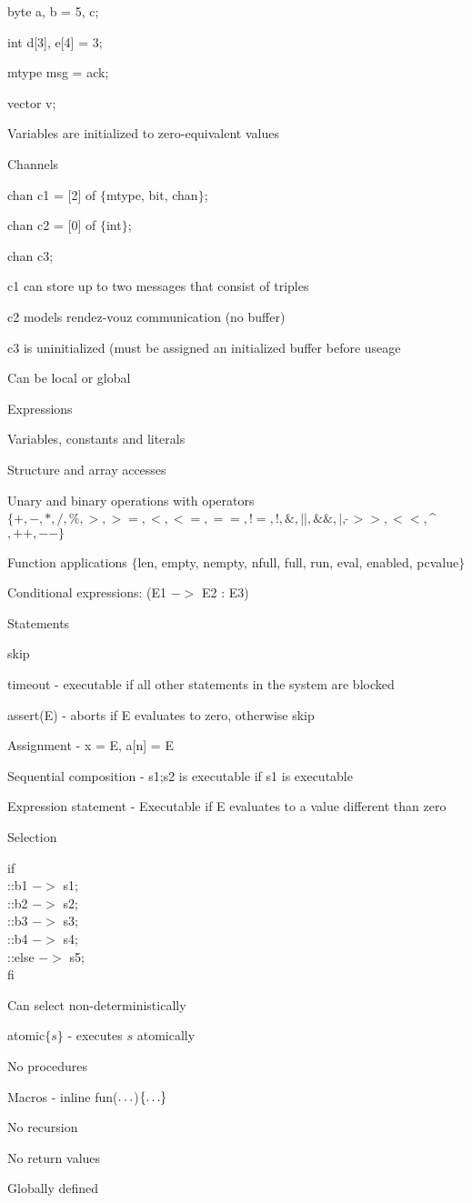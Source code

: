 			\enumstart
				\item byte a, b = 5, c;
				\item int d[3], e[4] = 3;
				\item mtype msg = ack;
				\item vector v;
				\item Variables are initialized to zero-equivalent values
			\enumend
			\item Channels
			\enumstart
				\item chan c1 = [2] of $\{$mtype, bit, chan$\}$;
				\item chan c2 = [0] of $\{$int$\}$;
				\item chan c3;
				\item c1 can store up to two messages that consist of triples
				\item c2 models rendez-vouz communication (no buffer)
				\item c3 is uninitialized (must be assigned an initialized buffer before useage
			\enumend
			\item Can be local or global
		\enumend
	\enumend
	\item Expressions
	\enumstart
		\item Variables, constants and literals
		\item Structure and array accesses
		\item Unary and binary operations with operators $\{+,-,*,/,\%,>,>=,<,<=,==,!=,!,\&,||,\&\&,|,\tilde \,>>,<<,$\textasciicircum$,++,--\}$
		\item Function applications $\{$len, empty, nempty, nfull, full, run, eval, enabled, pcvalue$\}$
		\item Conditional expressions: (E1 $->$ E2 : E3)
	\enumend
	\item Statements
	\enumstart
		\item skip
		\item timeout - executable if all other statements in the system are blocked
		\item assert(E) - aborts if E evaluates to zero, otherwise skip
		\item Assignment - x = E, a[n] = E
		\item Sequential composition - s1;s2 is executable if s1 is executable
		\item Expression statement - Executable if E evaluates to a value different than zero
		\item Selection
		\enumstart
			\item if \\::b1 $->$ s1;\\::b2 $->$ s2;\\::b3 $->$ s3;\\::b4 $->$ s4;\\::else $->$ s5;\\fi
			\item Can select non-deterministically
		\enumend
		\item atomic$\{s\}$ - executes $s$ atomically
	\enumend
	\item No procedures
	\item Macros - inline fun($\mathellipsis$)$\{\mathellipsis\}$
	\enumstart
		\item No recursion
		\item No return values
		\item Globally defined
	\enumend
\enumend
